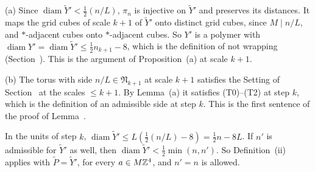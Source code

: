 \begin{step}[(a) and (b)]
(a) Since $\operatorname{diam}\tilde Y'<\frac12(n/L)$, $\pi_n$ is injective on $\tilde Y'$ and preserves its distances. It maps the grid cubes of scale $k+1$ of $\tilde Y'$ onto distinct grid cubes, since $M\mid n/L$, and $*$-adjacent cubes onto $*$-adjacent cubes. So $Y'$ is a polymer with $\operatorname{diam}Y'=\operatorname{diam}\tilde Y'\le\frac12n_{k+1}-8$, which is the definition of not wrapping (Section~). This is the argument of Proposition~(a) at scale $k+1$.

(b) The torus with side $n/L\in\mathfrak N_{k+1}$ at scale $k+1$ satisfies the Setting of Section~ at the scales $\le k+1$. By Lemma~(a) it satisfies (T0)--(T2) at step $k$, which is the definition of an admissible side at step $k$. This is the first sentence of the proof of Lemma~.
\end{step}

\begin{step}
In the units of step $k$, $\operatorname{diam}\tilde Y'\le L(\frac12(n/L)-8)=\frac12n-8L$. If $n'$ is admissible for $\tilde Y'$ as well, then $\operatorname{diam}\tilde Y'<\frac12\min(n,n')$. So Definition~(ii) applies with $\tilde P=\tilde Y'$, for every $a\in M\mathbb Z^4$, and $n'=n$ is allowed.
\end{step}

